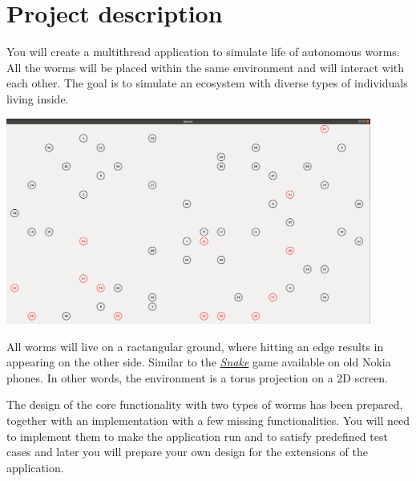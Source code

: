 \documentclass{article}
\begin{document}
\newcommand{\todo}[1]{\vspace{.5cm} TODO: #1 \vspace{.5cm}}

\section{Project description}

You will create a multithread application to simulate life of autonomous worms.
All the worms will be placed within the same environment and will interact
with each other. The goal is to simulate an ecosystem with diverse types
of individuals living inside.

\begin{center}
\includegraphics[width=12cm]{wormsApp}
\end{center}

All worms will live on a ractangular ground, where hitting an edge results
in appearing on the other side. Similar to the
\href{https://elgoog.im/snake/}{\textit{Snake}} game available on old Nokia
phones. In other words, the environment is a torus projection on a 2D
screen.

\begin{center}
\end{center}

The design of the core functionality with two types of worms has been prepared,
together with an implementation with a few missing functionalities. You will
need to implement them to make the application run and to satisfy predefined
test cases and later you will prepare your own design for the extensions
of the application.
\end{document}
